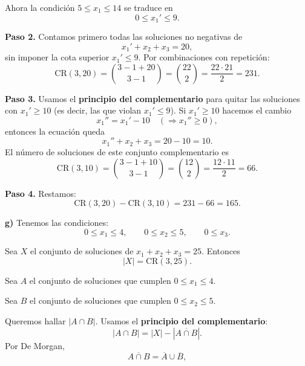 \documentclass[a4paper,12pt]{article}
\begin{document}
\begin{ejercicio}[title=Ejercicio 31]

Ahora la condición \(5 \le x_1 \le 14\) se traduce en
\[
0 \le x_1' \le 9.
\]

\medskip

\textbf{Paso 2.} Contamos primero todas las soluciones no negativas de
\[
x_1' + x_2 + x_3 = 20,
\]
sin imponer la cota superior \(x_1' \le 9\). Por combinaciones con repetición:
\[
\mathrm{CR}(3,20)=\binom{3-1+20}{3-1}=\binom{22}{2}=\frac{22\cdot 21}{2}=231.
\]

\medskip

\textbf{Paso 3.} Usamos el \textbf{principio del complementario} para quitar las soluciones con \(x_1' \ge 10\) (es decir, las que violan \(x_1' \le 9\)). Si \(x_1' \ge 10\) hacemos el cambio
\[
x_1'' = x_1' - 10 \quad (\Rightarrow x_1''\ge 0),
\]
entonces la ecuación queda
\[
x_1'' + x_2 + x_3 = 20 - 10 = 10.
\]
El número de soluciones de este conjunto complementario es
\[
\mathrm{CR}(3,10)=\binom{3-1+10}{3-1}=\binom{12}{2}=\frac{12\cdot 11}{2}=66.
\]

\medskip

\textbf{Paso 4.} Restamos:
\[
\mathrm{CR}(3,20) - \mathrm{CR}(3,10) = 231 - 66 = \boxed{165}.
\]

\bigskip

\textbf{g)} Tenemos las condiciones:
\[
0 \le x_1 \le 4,\qquad 0 \le x_2 \le 5,\qquad 0 \le x_3.
\]

Sea \(X\) el conjunto de soluciones de \(x_1+x_2+x_3=25\).  
Entonces
\[
|X| = \mathrm{CR}(3,25).
\]

Sea \(A\) el conjunto de soluciones que cumplen \(0\le x_1\le 4\).  

Sea \(B\) el conjunto de soluciones que cumplen \(0\le x_2\le 5\).  

\vspace{0.5em}

Queremos hallar \(|A\cap B|\). Usamos el \textbf{principio del complementario}:
\[
|A\cap B| = |X| - |\overline{A\cap B}|.
\]
Por De Morgan,
\[
\overline{A\cap B}=\overline{A}\cup\overline{B},
\]
\end{ejercicio}
\end{document}
